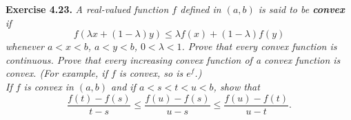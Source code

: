 \documentclass{article}
\begin{document}



\textbf{Exercise 4.23.}
\emph{A real-valued function $f$ defined in $(a,b)$
is said to be \textbf{convex} if
$$f(\lambda x + (1 - \lambda) y) \leq \lambda f(x) + (1 - \lambda) f(y)$$
whenever $a < x < b$, $a < y < b$, $0 < \lambda < 1$.
Prove that every convex function is continuous.
Prove that every increasing convex function of a convex function is convex.
(For example, if $f$ is convex, so is $e^f$.)} \\

\emph{If $f$ is convex in $(a,b)$ and if $a < s < t < u < b$,
show that
$$\frac{f(t)-f(s)}{t-s}
\leq \frac{f(u)-f(s)}{u-s}
\leq \frac{f(u)-f(t)}{u-t}.$$} \\
\end{document}
